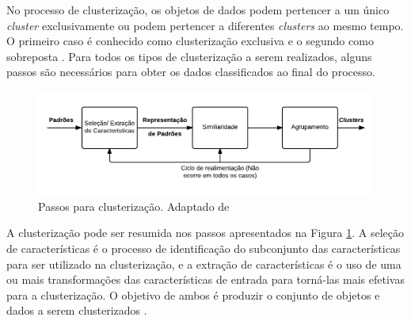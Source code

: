 No processo de clusterização, os objetos de dados podem pertencer a um único \textit{cluster} exclusivamente ou podem
pertencer a diferentes \textit{clusters} ao mesmo tempo. O primeiro caso é conhecido como clusterização exclusiva e o segundo como sobreposta \cite{tan2013data}. 
Para todos os tipos de clusterização a serem realizados, alguns passos são necessários para obter os dados classificados ao final do processo.
% 
% 
% 


\begin{figure}[h!]
\centering
\includegraphics[scale=0.5]{figuras/tasks_clustering.png}
\caption{Passos para clusterização. Adaptado de }
\label{fig:tasks_clustering}
\end{figure}

A clusterização pode ser resumida nos passos apresentados na Figura \ref{fig:tasks_clustering}.
A seleção de características é o processo de identificação do subconjunto das características para ser utilizado na clusterização, 
e a extração de características é o uso de uma ou mais transformações das características de entrada para 
torná-las mais efetivas para a clusterização. O objetivo de ambos é produzir o conjunto de objetos e dados a serem clusterizados \cite{clustering_review}.

